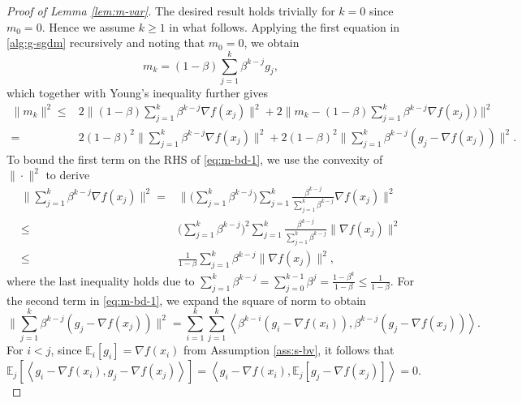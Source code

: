 \documentclass[10pt]{article}
\numberwithin{equation}{section}
\theoremstyle{definition}
\newcommand{\ebb}{\mathbb{E}}  %
\begin{document}
\begin{proof}[Proof of Lemma \ref{lem:m-var}]
    The desired result holds trivially for $k=0$ since $m_0=0$. Hence we assume $k\ge 1$ in what follows. Applying the first equation in \eqref{alg:g-sgdm} recursively and noting that $m_0=0$, we obtain
    \[
    m_k = (1-\beta) \sum_{j=1}^k \beta^{k-j} g_j, 
    \]
    which together with Young's inequality further gives
    \begin{equation}\label{eq:m-bd-1}
    \begin{aligned}
        \|m_k\|^2 \leq& 2\Big\|(1-\beta) \sum_{j=1}^k \beta^{k-j} \nabla f(x_j)\Big\|^2+2\Big\|m_k-(1-\beta) \sum_{j=1}^k \beta^{k-j}\nabla f(x_j))\Big\|^2\\
        =&2(1-\beta)^2\Big\|\sum_{j=1}^k \beta^{k-j} \nabla f(x_j)\Big\|^2+2(1-\beta)^2 \Big\|\sum_{j=1}^k \beta^{k-j}(g_j-\nabla f(x_j))\Big\|^2.
    \end{aligned}
    \end{equation}
    To bound the first term on the RHS of \eqref{eq:m-bd-1}, we use the convexity of $\|\cdot\|^2$ to derive
    \begin{equation}\label{eq:m-bd-term1}
    \begin{aligned}
        \Big\|\sum_{j=1}^k \beta^{k-j} \nabla f(x_j)\Big\|^2=&\Big\|\Big(\sum_{j=1}^k \beta^{k-j}\Big)\sum_{j=1}^k \frac{\beta^{k-j}}{\sum_{j=1}^k \beta^{k-j}} \nabla f(x_j)\Big\|^2\\
        \leq&\Big(\sum_{j=1}^k \beta^{k-j}\Big)^2\sum_{j=1}^k \frac{\beta^{k-j}}{\sum_{j=1}^k \beta^{k-j}} \|\nabla f(x_j)\|^2\\
        \leq&\frac{1}{1-\beta}\sum_{j=1}^k \beta^{k-j} \|\nabla f(x_j)\|^2,
    \end{aligned}
    \end{equation}
    where the last inequality holds due to $\sum_{j=1}^k \beta^{k-j}=\sum_{j=0}^{k-1} \beta^j=\frac{1-\beta^k}{1-\beta}\leq \frac{1}{1-\beta}$. For the second term in \eqref{eq:m-bd-1}, we expand the square of norm to obtain
    \begin{equation}\label{eq:m-bd-2}
        \Big\|\sum_{j=1}^k \beta^{k-j}(g_j-\nabla f(x_j))\Big\|^2=\sum_{i=1}^k \sum_{j=1}^k\left\langle\beta^{k-i}\left(g_i-\nabla f(x_i)\right), \beta^{k-j}\left(g_j-\nabla f(x_j)\right)\right\rangle.
    \end{equation}
    For $i<j$, since $\ebb_i[g_i]=\nabla f(x_i)$ from Assumption \ref{ass:s-bv}, it follows that
    \begin{equation}\label{eq:m-bd-3}
        \ebb_j[\left\langle g_i-\nabla f(x_i), g_j-\nabla f(x_j)\right\rangle] = \left\langle g_i-\nabla f(x_i), \ebb_j[g_j-\nabla f(x_j)]\right\rangle = 0.

\end{equation}
\end{proof}
\end{document}
